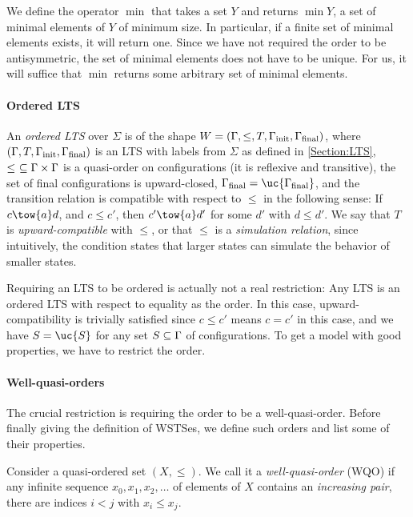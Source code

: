 \documentclass[../../diss.tex]{subfiles}
\begin{document}
We define the operator $\min$ that takes a set $Y$ and returns $\min Y$, a set of minimal elements of $Y$ of minimum size.
In particular, if a finite set of minimal elements exists, it will return one.
Since we have not required the order to be antisymmetric, the set of minimal elements does not have to be unique.
For us, it will suffice that $\min$ returns some arbitrary set of minimal elements.

\paragraph{Ordered LTS}

An \emph{ordered LTS} over $\Sigma$ is of the shape $W = (\Gamma,\leq,T,\Gamma_{\text{init}}, \Gamma_{\text{final}})$, where $(\Gamma,T,\Gamma_{\text{init}}, \Gamma_{\text{final}})$ is an LTS with labels from $\Sigma$ as defined in \cref{Section:LTS}, $\leq \ \subseteq \Gamma \times \Gamma$ is a quasi-order on configurations (\ie it is reflexive and transitive), the set of final configurations is upward-closed, \ie $\configs_\final = \uc{\configs_\final}$, and the transition relation is compatible with respect to $\leq$ in the following sense:
If $c \tow{a} d$, and $c \leq c'$, then $c' \tow{a} d'$ for some $d'$ with $d \leq d'$.
We say that $T$ is \emph{upward-compatible} with $\leq$, or that $\leq$ is a \emph{simulation relation}, since intuitively, the condition states that larger states can simulate the behavior of smaller states.

Requiring an LTS to be ordered is actually not a real restriction: Any LTS is an ordered LTS with respect to equality as the order.
In this case, upward-compatibility is trivially satisfied since $c \leq c'$ means $c = c'$ in this case, and we have $S = \uc{S}$ for any set $S \subseteq \Gamma$ of configurations.
To get a model with good properties, we have to restrict the order.

\paragraph{Well-quasi-orders}

The crucial restriction is requiring the order to be a well-quasi-order.
Before finally giving the definition of WSTSes, we define such orders and list some of their properties.

Consider a quasi-ordered set $(X,\leq)$.
We call it a \emph{well-quasi-order} (WQO) if any infinite sequence $x_0, x_1, x_2, \ldots$ of elements of $X$ contains an \emph{increasing pair}, \ie there are indices $i < j$ with $x_i \leq x_j$.
\end{document}
